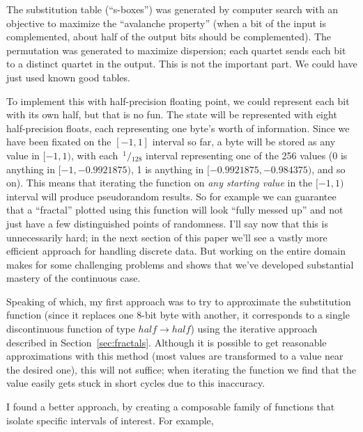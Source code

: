 \documentclass[twocolumn]{article}
\newcommand\sfrac[2]{\!{}\,^{#1}\!/{}\!_{#2}}
\begin{document}
The substitution table (``s-boxes'') was generated by computer search
with an objective to maximize the ``avalanche property'' (when a bit
of the input is complemented, about half of the output bits should be
complemented). The permutation was generated to maximize dispersion;
each quartet sends each bit to a distinct quartet in the output. This
is not the important part. We could have just used known good tables.

To implement this with half-precision floating point, we could
represent each bit with its own half, but that is no fun. The state
will be represented with eight half-precision floats, each
representing one byte's worth of information. Since we have been fixated
on the $[-1, 1]$ interval so far, a byte will be stored as
any value in $[-1, 1)$, with each $\sfrac{1}{128}$ interval representing
one of the 256 values (0 is anything in $[-1, -0.9921875)$, 1 is
anything in $[-0.9921875, -0.984375)$, and so on). This means that
iterating the function on {\em any starting value} in the $[-1, 1)$
interval will produce pseudorandom results. So for example
we can guarantee that a ``fractal'' plotted using this function
will look ``fully messed up'' and not just have a few
distinguished points of randomness.
I'll say now that this is unnecessarily hard; in the next
section of this paper we'll see a vastly more efficient
approach for handling discrete data. But working on the entire domain
makes for some challenging problems and shows that we've developed
substantial mastery of the continuous case.

Speaking of which, my first approach was to try to approximate the
substitution function (since it replaces one 8-bit byte with another,
it corresponds to a single discontinuous function of type $half
\rightarrow half$) using the iterative approach described in
Section~\ref{sec:fractals}. Although it is possible to get reasonable
approximations with this method (most values are transformed to a
value near the desired one), this will not suffice; when iterating the
function we find that the value easily gets stuck in short cycles due
to this inaccuracy.

I found a better approach, by creating a composable family of functions
that isolate specific intervals of interest. For example,
\end{document}
